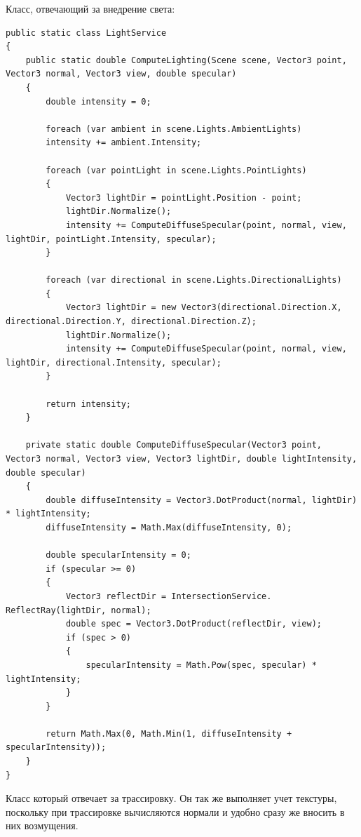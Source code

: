 Класс, отвечающий за внедрение света:
\begin{lstlisting}[caption={Класс LightService}, label={lst:3-3}]
public static class LightService
{
	public static double ComputeLighting(Scene scene, Vector3 point, Vector3 normal, Vector3 view, double specular)
	{
		double intensity = 0;
		
		foreach (var ambient in scene.Lights.AmbientLights)
		intensity += ambient.Intensity;
		
		foreach (var pointLight in scene.Lights.PointLights)
		{
			Vector3 lightDir = pointLight.Position - point;
			lightDir.Normalize();
			intensity += ComputeDiffuseSpecular(point, normal, view, lightDir, pointLight.Intensity, specular);
		}
		
		foreach (var directional in scene.Lights.DirectionalLights)
		{
			Vector3 lightDir = new Vector3(directional.Direction.X, directional.Direction.Y, directional.Direction.Z);
			lightDir.Normalize();
			intensity += ComputeDiffuseSpecular(point, normal, view, lightDir, directional.Intensity, specular);
		}
		
		return intensity;
	}
	
	private static double ComputeDiffuseSpecular(Vector3 point, Vector3 normal, Vector3 view, Vector3 lightDir, double lightIntensity, double specular)
	{
		double diffuseIntensity = Vector3.DotProduct(normal, lightDir) * lightIntensity;
		diffuseIntensity = Math.Max(diffuseIntensity, 0);
		
		double specularIntensity = 0;
		if (specular >= 0)
		{
			Vector3 reflectDir = IntersectionService. ReflectRay(lightDir, normal);
			double spec = Vector3.DotProduct(reflectDir, view);
			if (spec > 0)
			{
				specularIntensity = Math.Pow(spec, specular) * lightIntensity;
			}
		}
		
		return Math.Max(0, Math.Min(1, diffuseIntensity + specularIntensity));
	}
}
\end{lstlisting}

Класс который отвечает за трассировку. Он так же выполняет учет текстуры, поскольку при трассировке вычисляются нормали и удобно сразу же вносить в них возмущения.

